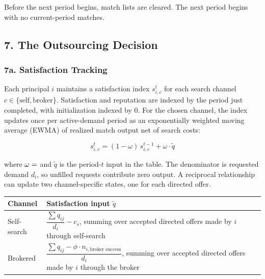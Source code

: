 \documentclass[11pt]{article}
\begin{document}
Before the next period begins, match lists are cleared. The next period begins with no current-period matches.

\subsection{7. The Outsourcing Decision}\label{the-outsourcing-decision}

\subsubsection{7a. Satisfaction Tracking}\label{a.-satisfaction-tracking}

Each principal \(i\) maintains a satisfaction index \(s_{i,c}^t\) for each search channel \(c \in \{\text{self}, \text{broker}\}\). Satisfaction and reputation are indexed by the period just completed, with initialization indexed by 0. For the chosen channel, the index updates once per active-demand period as an exponentially weighted moving average (EWMA) of realized match output net of search costs:

\[s_{i,c}^{t} = (1 - \omega)\,s_{i,c}^{t-1} + \omega \cdot \tilde{q}\]

where \(\omega = \pv{settingomega}\) and \(\tilde{q}\) is the period-\(t\) input in the table. The denominator is requested demand \(d_i\), so unfilled requests contribute zero output. A reciprocal relationship can update two channel-specific states, one for each directed offer.

{
\begin{longtable}[]{@{}
  >{\raggedright\arraybackslash}p{}
  >{\raggedright\arraybackslash}p{}@{}}
\toprule\noalign{}
\begin{minipage}[b]{\linewidth}\raggedright
Channel
\end{minipage} & \begin{minipage}[b]{\linewidth}\raggedright
Satisfaction input \(\tilde{q}\)
\end{minipage} \\
\midrule\noalign{}
\endhead
\bottomrule\noalign{}
\endlastfoot
Self-search & \(\dfrac{\sum q_{ij}}{d_i} - c_s\), summing over accepted directed offers made by \(i\) through self-search \\
Brokered & \(\dfrac{\sum q_{ij} - \phi \cdot n_{i,\text{broker success}}}{d_i}\), summing over accepted directed offers made by \(i\) through the broker \\
\end{longtable}
}
\end{document}
